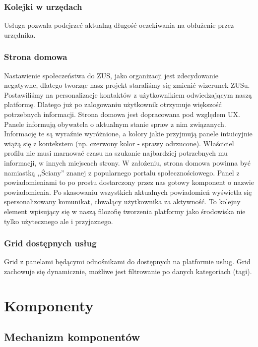 \documentclass[licencjacka]{pracamgr}
\begin{document}
\subsubsection{Kolejki w urzędach}
Usługa pozwala podejrzeć aktualną długość oczekiwania na obłużenie przez urzędnika.

\subsubsection{Strona domowa}
Nastawienie społeczeństwa do ZUS, jako organizacji jest zdecydowanie negatywne, dlatego tworząc nasz projekt staraliśmy się
zmienić wizerunek ZUSu. Postawiliśmy na personalizacje kontaktów z użytkownikiem odwiedzającym naszą platformę. Dlatego już po zalogowaniu
użytkownik otrzymuje większość potrzebnych informacji. Strona domowa jest dopracowana pod względem UX. Panele informują
obywatela o aktualnym stanie spraw z nim związanych. Informację te są wyraźnie wyróżnione, a kolory jakie przyjmują panele
intuicyjnie wiążą się z kontekstem (np. czerwony kolor - sprawy odrzucone). Właściciel profilu nie musi marnować czasu
na szukanie najbardziej potrzebnych mu informacji, w innych miejscach strony. W założeniu, strona domowa powinna być
namiastką ,,Ściany'' znanej z popularnego portalu społecznościowego. Panel z powiadomieniami to po prostu dostarczony
przez nas gotowy komponent o nazwie powiadomienia. Po skasowaniu wszystkich aktualnych powiadomień wyświetla się spersonalizowany
komunikat, chwalący użytkownika za aktywność. To kolejny element wpisujący się w naszą filozofię tworzenia platformy jako
środowiska nie tylko użytecznego ale i przyjaznego.

\subsubsection{Grid dostępnych usług}
Grid z panelami będącymi odnośnikami do dostępnych na platformie usług. Grid zachowuje się dynamicznie,
możliwe jest filtrowanie po danych kategoriach (tagi).

\section{Komponenty}
\subsection{Mechanizm komponentów}
\end{document}
